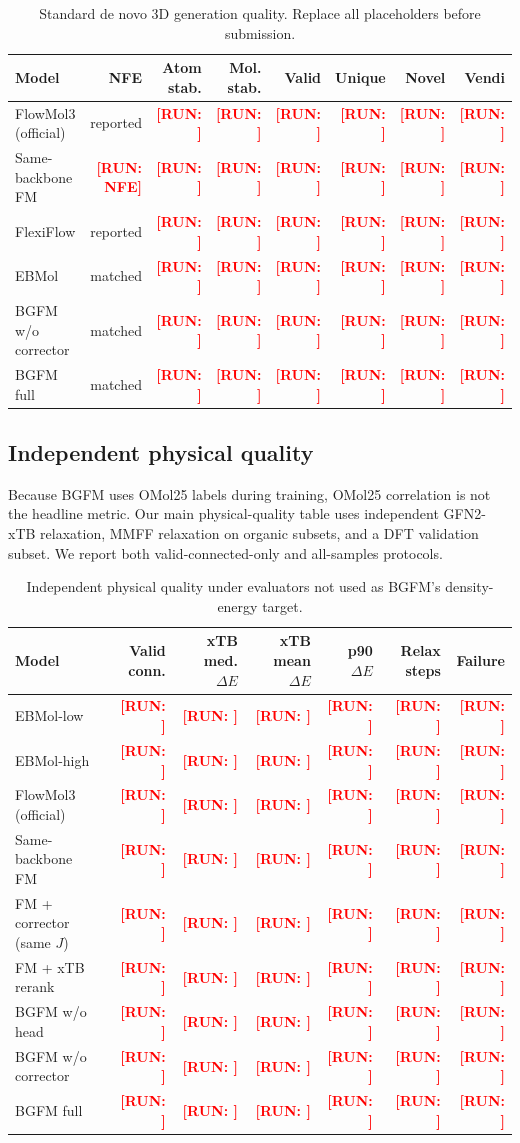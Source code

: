 \documentclass{article}
\newcommand{\Run}[1]{\textcolor{red}{\textbf{[RUN: #1]}}}
\begin{document}
\begin{table}[h]
\centering
\caption{Standard de novo 3D generation quality. Replace all placeholders before submission.}
\begin{tabular}{lrrrrrrr}
\toprule
Model & NFE & Atom stab. & Mol. stab. & Valid & Unique & Novel & Vendi \\
\midrule
FlowMol3 (official) & reported & \Run{} & \Run{} & \Run{} & \Run{} & \Run{} & \Run{} \\
Same-backbone FM & \Run{NFE} & \Run{} & \Run{} & \Run{} & \Run{} & \Run{} & \Run{} \\
FlexiFlow & reported & \Run{} & \Run{} & \Run{} & \Run{} & \Run{} & \Run{} \\
EBMol & matched & \Run{} & \Run{} & \Run{} & \Run{} & \Run{} & \Run{} \\
BGFM w/o corrector & matched & \Run{} & \Run{} & \Run{} & \Run{} & \Run{} & \Run{} \\
BGFM full & matched & \Run{} & \Run{} & \Run{} & \Run{} & \Run{} & \Run{} \\
\bottomrule
\end{tabular}
\end{table}

\subsection{Independent physical quality}

Because BGFM uses OMol25 labels during training, OMol25 correlation is
not the headline metric. Our main physical-quality table uses independent
GFN2-xTB relaxation, MMFF relaxation on organic subsets, and a DFT
validation subset. We report both valid-connected-only and all-samples
protocols.

\begin{table}[h]
\centering
\caption{Independent physical quality under evaluators not used as BGFM's density-energy target.}
\begin{tabular}{lrrrrrr}
\toprule
Model & Valid conn. & xTB med. $\Delta E$ & xTB mean $\Delta E$ & p90 $\Delta E$ & Relax steps & Failure \\
\midrule
EBMol-low & \Run{} & \Run{} & \Run{} & \Run{} & \Run{} & \Run{} \\
EBMol-high & \Run{} & \Run{} & \Run{} & \Run{} & \Run{} & \Run{} \\
FlowMol3 (official) & \Run{} & \Run{} & \Run{} & \Run{} & \Run{} & \Run{} \\
Same-backbone FM & \Run{} & \Run{} & \Run{} & \Run{} & \Run{} & \Run{} \\
FM + corrector (same $J$) & \Run{} & \Run{} & \Run{} & \Run{} & \Run{} & \Run{} \\
FM + xTB rerank & \Run{} & \Run{} & \Run{} & \Run{} & \Run{} & \Run{} \\
BGFM w/o head & \Run{} & \Run{} & \Run{} & \Run{} & \Run{} & \Run{} \\
BGFM w/o corrector & \Run{} & \Run{} & \Run{} & \Run{} & \Run{} & \Run{} \\
BGFM full & \Run{} & \Run{} & \Run{} & \Run{} & \Run{} & \Run{} \\
\bottomrule
\end{tabular}
\end{table}
\end{document}
